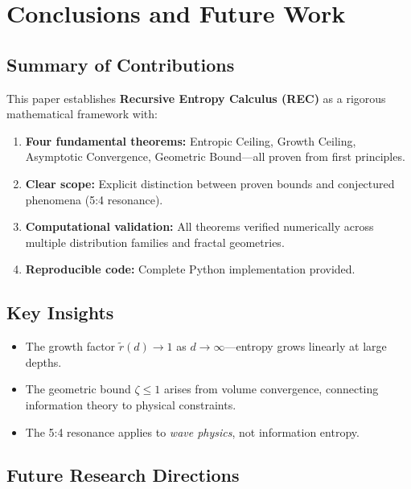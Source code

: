 \documentclass[11pt,a4paper]{article}
\theoremstyle{definition}
\theoremstyle{remark}
\newcommand{\rtilde}{\tilde{r}}
\begin{document}
\section{Conclusions and Future Work}
\label{sec:conclusion}

\subsection{Summary of Contributions}

This paper establishes \textbf{Recursive Entropy Calculus (REC)} as a rigorous mathematical framework with:

\begin{enumerate}
    \item \textbf{Four fundamental theorems:} Entropic Ceiling, Growth Ceiling, Asymptotic Convergence, Geometric Bound---all proven from first principles.
    
    \item \textbf{Clear scope:} Explicit distinction between proven bounds and conjectured phenomena (5:4 resonance).
    
    \item \textbf{Computational validation:} All theorems verified numerically across multiple distribution families and fractal geometries.
    
    \item \textbf{Reproducible code:} Complete Python implementation provided.
\end{enumerate}

\subsection{Key Insights}

\begin{itemize}
    \item The growth factor $\rtilde(d) \to 1$ as $d \to \infty$---entropy grows linearly at large depths.
    \item The geometric bound $\zeta \leq 1$ arises from volume convergence, connecting information theory to physical constraints.
    \item The 5:4 resonance applies to \emph{wave physics}, not information entropy.
\end{itemize}

\subsection{Future Research Directions}
\end{document}

